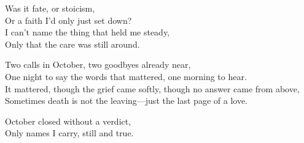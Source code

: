 \begin{lyrics}
Was it fate, or stoicism,\\
Or a faith I’d only just set down?\\
I can’t name the thing that held me steady,\\
Only that the care was still around.

Two calls in October, two goodbyes already near,\\
One night to say the words that mattered, one morning to hear.\\
It mattered, though the grief came softly, though no answer came from above,\\
Sometimes death is not the leaving—just the last page of a love.

October closed without a verdict,\\
Only names I carry, still and true.
\end{lyrics}

